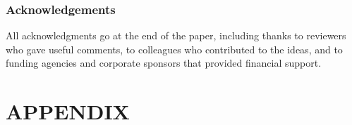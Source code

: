 \documentclass[twoside]{article}
\begin{document}
\subsubsection*{Acknowledgements}
All acknowledgments go at the end of the paper, including thanks to reviewers who gave useful comments, to colleagues who contributed to the ideas, and to funding agencies and corporate sponsors that provided financial support.

 

\clearpage
\onecolumn
\section*{APPENDIX}

%
\end{document}
